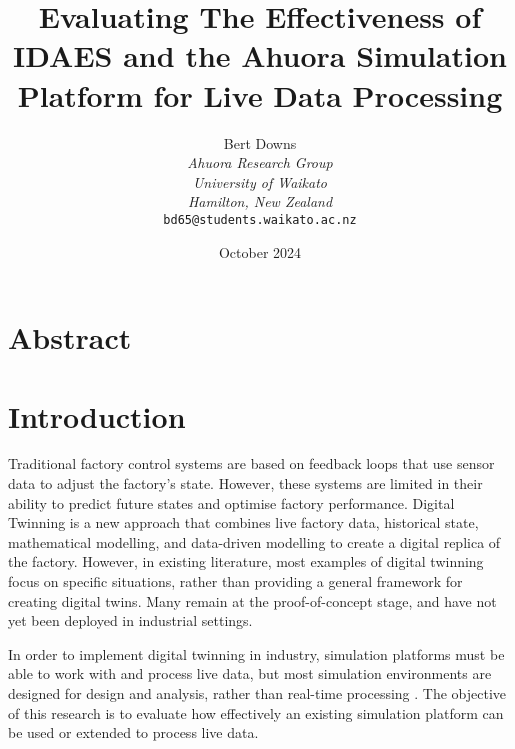 \documentclass[12pt]{article}
\title{Evaluating The Effectiveness of IDAES and the Ahuora Simulation Platform for Live Data Processing}
\author{Bert Downs\\
\textit{Ahuora Research Group}\\
\textit{University of Waikato}\\
\textit{Hamilton, New Zealand}\\
\texttt{bd65@students.waikato.ac.nz}}
\date{October 2024}
\begin{document}
\maketitle

\section*{Abstract}



\section{Introduction}


Traditional factory control systems are based on feedback loops that use sensor data to adjust the factory's state. However, these systems are limited in their ability to predict future states and optimise factory performance. Digital Twinning is a new approach that combines live factory data, historical state, mathematical modelling, and data-driven modelling to create a digital replica of the factory. 
However, in existing literature, most examples of digital twinning focus on specific situations, rather than providing a general framework for creating digital twins. Many remain at the proof-of-concept stage, and have not yet been deployed in industrial settings.

In order to implement digital twinning in industry, simulation platforms must be able to work with and process live data, but most simulation environments are designed for design and analysis, rather than real-time processing \cite{agi2024computational}. The objective of this research is to evaluate how effectively an existing simulation platform can be used or extended to process live data.
\end{document}
